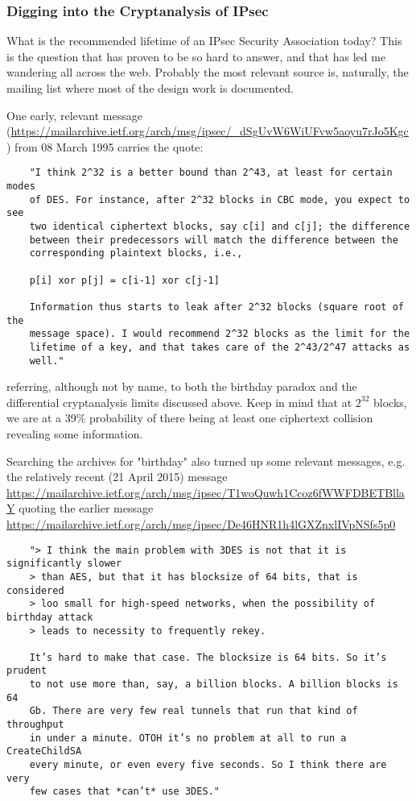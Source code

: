 \documentclass[%
 aip,
 jmp,%
 amsmath,amssymb,
 reprint,%
]{revtex4-1}
\begin{document}
\subsubsection{Digging into the Cryptanalysis of IPsec}

What is the recommended lifetime of an IPsec Security Association
today?  This is the question that has proven to be so hard to answer,
and that has led me wandering all across the web.  Probably the most
relevant source is, naturally, the mailing list where most of the
design work is documented.

One early, relevant message
(\url{https://mailarchive.ietf.org/arch/msg/ipsec/_dSgUvW6WiUFvw5aoyu7rJo5Kgc})
from 08 March 1995 carries the quote:

\begin{widetext}
\begin{verbatim}
	"I think 2^32 is a better bound than 2^43, at least for certain modes
	of DES. For instance, after 2^32 blocks in CBC mode, you expect to see
	two identical ciphertext blocks, say c[i] and c[j]; the difference
	between their predecessors will match the difference between the
	corresponding plaintext blocks, i.e.,

	p[i] xor p[j] = c[i-1] xor c[j-1]

	Information thus starts to leak after 2^32 blocks (square root of the
	message space). I would recommend 2^32 blocks as the limit for the
	lifetime of a key, and that takes care of the 2^43/2^47 attacks as
	well."
\end{verbatim}
\end{widetext}
referring, although not by name, to both the birthday paradox and the
differential cryptanalysis limits discussed above.  Keep in mind that
at $2^{32}$ blocks, we are at a 39\% probability of there being at least
one ciphertext collision revealing some information.

Searching the archives for "birthday" also turned up some relevant
messages, e.g. the relatively recent (21 April 2015) message
\url{https://mailarchive.ietf.org/arch/msg/ipsec/T1woQuwh1Ccoz6fWWFDBETBllaY}
quoting the earlier message
\url{https://mailarchive.ietf.org/arch/msg/ipsec/De46HNR1h4lGXZnxlIVpNSfs5p0}

\begin{widetext}
\begin{verbatim}
	"> I think the main problem with 3DES is not that it is significantly slower
	> than AES, but that it has blocksize of 64 bits, that is considered
	> loo small for high-speed networks, when the possibility of birthday attack
	> leads to necessity to frequently rekey.

	It’s hard to make that case. The blocksize is 64 bits. So it’s prudent
	to not use more than, say, a billion blocks. A billion blocks is 64
	Gb. There are very few real tunnels that run that kind of throughput
	in under a minute. OTOH it’s no problem at all to run a CreateChildSA
	every minute, or even every five seconds. So I think there are very
	few cases that *can’t* use 3DES."
\end{verbatim}
\end{widetext}
\end{document}
